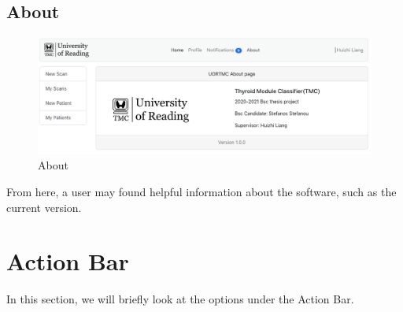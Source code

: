 		\subsection{About}
			\begin{figure}[H]
				\iftrue
				\centering
				\caption{About}
				\includegraphics[scale=0.3]{figures/about}
				\fi
			\end{figure}
			From here, a user may found helpful information about the software, such as the current version.
	\section{Action Bar}
		In this section, we will briefly look at the options under the Action Bar.

